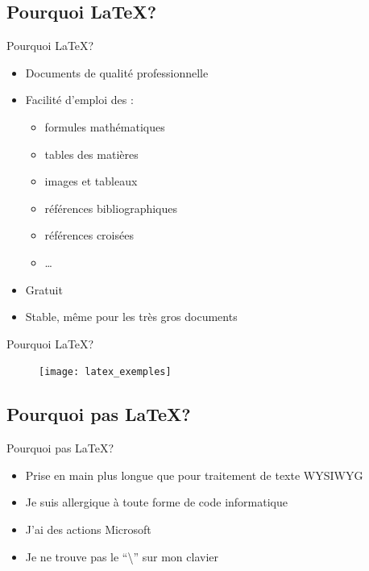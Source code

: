 \documentclass[10pt,svgnames,usenames,table]{beamer} %
\begin{document}
\subsection{Pourquoi \LaTeX{}?}
\begin{frame}{Pourquoi \LaTeX{}?}

  \begin{itemize}
      \item Documents de qualité professionnelle
    \item Facilité d'emploi des :
    \begin{itemize}
        \item formules mathématiques
        \item tables des matières
        \item images et tableaux
        \item références bibliographiques
        \item références croisées
        \item \ldots{}
    \end{itemize}
    \item Gratuit
    \item Stable, même pour les très gros documents
  \end{itemize}
\end{frame}

\begin{frame}{Pourquoi \LaTeX{}?}

\begin{figure}[htbp]
\begin{center}
\texttt{[image: latex\_exemples]}
\end{center}
\end{figure}
\end{frame}

\subsection{Pourquoi pas \LaTeX{}?}
\begin{frame}{Pourquoi pas \LaTeX{}?}

  \begin{itemize}
    \item Prise en main plus longue que pour traitement de texte WYSIWYG
    \item Je suis allergique à toute forme de code informatique
    \item J'ai des actions Microsoft
    \item Je ne trouve pas le ``\textbackslash'' sur mon clavier
  \end{itemize}
\end{frame}
\end{document}
